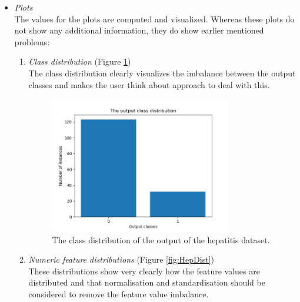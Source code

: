\documentclass[10pt,a4paper]{report}
\begin{document}
\begin{itemize}
		\item \textit{Plots} \\
		
		The values for the plots are computed and visualized. Whereas these plots do not show any additional information, they do show earlier mentioned problems:
		
		\begin{enumerate}
			\item \textit{Class distribution} (Figure \ref{fig:HepClass})\\
			The class distribution clearly visualizes the imbalance between the output classes and makes the user think about approach to deal with this.
			
			\begin{figure}[H]
				\centering
				\includegraphics[width=0.8\textwidth]{Hep_Class.png}
				\caption{The class distribution of the output of the hepatitis dataset.}
				\label{fig:HepClass}
			\end{figure}
			
			\item \textit{Numeric feature distributions} (Figure \ref{fig:HepDist}) \\
			These distributions show very clearly how the feature values are distributed and that normalisation and standardisation should be considered to remove the feature value imbalance.
			

\end{enumerate}
\end{itemize}
\end{document}
